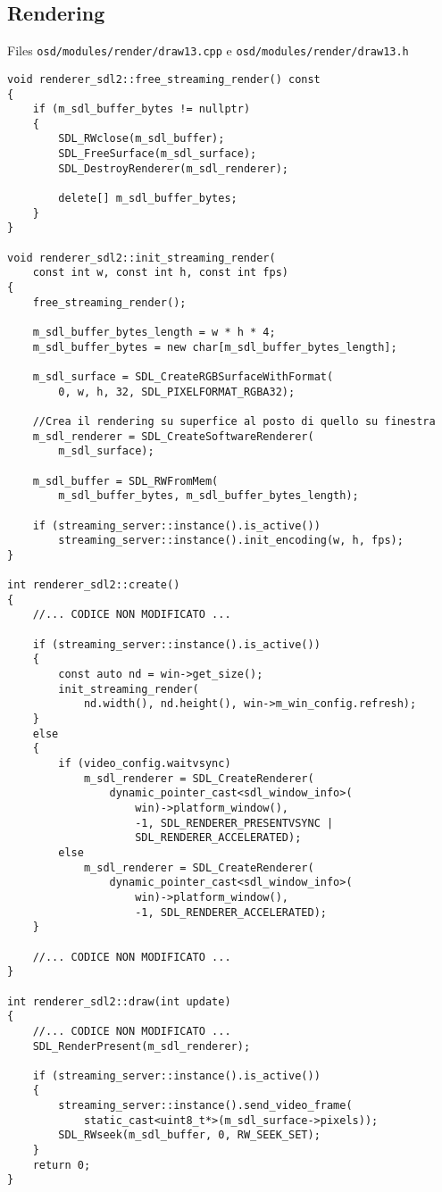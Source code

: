 \subsection{Rendering}
Files \verb|osd/modules/render/draw13.cpp| e \verb|osd/modules/render/draw13.h|

\begin{lstlisting}[label={lst:draw13}]
void renderer_sdl2::free_streaming_render() const
{
	if (m_sdl_buffer_bytes != nullptr)
	{
		SDL_RWclose(m_sdl_buffer);
		SDL_FreeSurface(m_sdl_surface);
		SDL_DestroyRenderer(m_sdl_renderer);

		delete[] m_sdl_buffer_bytes;
	}
}

void renderer_sdl2::init_streaming_render(
	const int w, const int h, const int fps)
{
	free_streaming_render();

	m_sdl_buffer_bytes_length = w * h * 4;
	m_sdl_buffer_bytes = new char[m_sdl_buffer_bytes_length];

	m_sdl_surface = SDL_CreateRGBSurfaceWithFormat(
		0, w, h, 32, SDL_PIXELFORMAT_RGBA32);

	//Crea il rendering su superfice al posto di quello su finestra
	m_sdl_renderer = SDL_CreateSoftwareRenderer(
		m_sdl_surface);

	m_sdl_buffer = SDL_RWFromMem(
		m_sdl_buffer_bytes, m_sdl_buffer_bytes_length);

	if (streaming_server::instance().is_active())
		streaming_server::instance().init_encoding(w, h, fps);
}

int renderer_sdl2::create()
{
	//... CODICE NON MODIFICATO ...

	if (streaming_server::instance().is_active())
	{
		const auto nd = win->get_size();
		init_streaming_render(
			nd.width(), nd.height(), win->m_win_config.refresh);
	}
	else
	{
		if (video_config.waitvsync)
			m_sdl_renderer = SDL_CreateRenderer(
				dynamic_pointer_cast<sdl_window_info>(
					win)->platform_window(), 
					-1, SDL_RENDERER_PRESENTVSYNC | 
					SDL_RENDERER_ACCELERATED);
		else
			m_sdl_renderer = SDL_CreateRenderer(
				dynamic_pointer_cast<sdl_window_info>(
					win)->platform_window(), 
					-1, SDL_RENDERER_ACCELERATED);
	}

	//... CODICE NON MODIFICATO ...
}

int renderer_sdl2::draw(int update)
{
	//... CODICE NON MODIFICATO ...
	SDL_RenderPresent(m_sdl_renderer);

	if (streaming_server::instance().is_active())
	{
		streaming_server::instance().send_video_frame(
			static_cast<uint8_t*>(m_sdl_surface->pixels));
		SDL_RWseek(m_sdl_buffer, 0, RW_SEEK_SET);
	}
	return 0;
}
\end{lstlisting}

